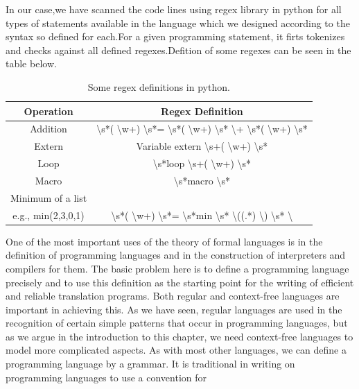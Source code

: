 \documentclass[a4paper,12pt]{extarticle}
\begin{document}
In our case,we have scanned the code lines using regex library in python for all
types of statements available in the language which we designed according to the
syntax so defined for each.For a given programming statement, it firts tokenizes and
checks against all defined regexes.Defition of some regexes can be seen in the table
below.
\begin{table}
\begin{tabular}{ ||c | c|| }
\hline
Operation & Regex Definition     \\
\hline \hline
Addition &   \textbackslash{}s*( \textbackslash{}w+) \textbackslash{}s*= \textbackslash{}s*( \textbackslash{}w+) \textbackslash{}s* \textbackslash{}+ \textbackslash{}s*( \textbackslash{}w+) \textbackslash{}s*  \\
\hline
Extern &Variable extern \textbackslash{}s+( \textbackslash{}w+) \textbackslash{}s*   \\
\hline
Loop & \textbackslash{}s*loop \textbackslash{}s+( \textbackslash{}w+) \textbackslash{}s*    \\
\hline
Macro & \textbackslash{}s*macro \textbackslash{}s*    \\
\hline
Minimum of a list &  \\
e.g., min(2,3,0,1) &  \textbackslash{}s*( \textbackslash{}w+) \textbackslash{}s*= \textbackslash{}s*min \textbackslash{}s* \textbackslash{}((.*) \textbackslash{}) \textbackslash{}s*    \textbackslash{}	\\
\hline
\end{tabular}
\caption{Some regex definitions in python.}
\label{regex_eq}
\end{table}
One of the most important uses of the theory of formal languages is in the definition
of programming languages and in the construction of interpreters and compilers
for them. The basic problem here is to define a programming language precisely and
to use this definition as the starting point for the writing of efficient and reliable
translation programs. Both regular and context-free languages are important in
achieving this. As we have seen, regular languages are used in the recognition of
certain simple patterns that occur in programming languages, but as we argue in
the introduction to this chapter, we need context-free languages to model more complicated
aspects.\newline
As with most other languages, we can define a programming language by a grammar.\newline
It is traditional in writing on programming languages to use a convention for
\end{document}
